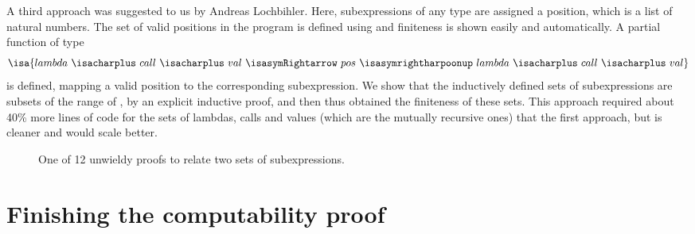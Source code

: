 \documentclass[a4paper,halfparskip,DIV=10,11pt]{scrbook}
\begin{document}
% 
A third approach was suggested to us by Andreas Lochbihler. Here, subexpressions of any type are assigned a position, which is a list of natural numbers. The set  of valid positions in the program  is defined using  and finiteness is shown easily and automatically. A partial function  of type
\[
\isa{lambda\ {\isacharplus}\ call\ {\isacharplus}\ val\ {\isasymRightarrow}\ pos\ {\isasymrightharpoonup}\ lambda\ {\isacharplus}\ call\ {\isacharplus}\ val}
\]
is defined, mapping a valid position to the corresponding subexpression. We show that the inductively defined sets of subexpressions are subsets of the range of , by an explicit inductive proof, and then thus obtained the finiteness of these sets. This approach required about 40\% more lines of code for the sets of lambdas, calls and values (which are the mutually recursive ones) that the first approach, but is cleaner and would scale better.

 

\begin{figure}
\begin{framed}

\end{framed}
\caption{One of 12 unwieldy proofs to relate two sets of subexpressions.}
\label{fig:subexprlemma}
\end{figure}

\section{Finishing the computability proof}
\end{document}

